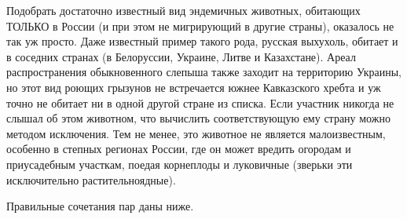 Подобрать достаточно известный вид эндемичных животных, обитающих ТОЛЬКО в России (и при этом не мигрирующий в другие страны), оказалось не так уж просто. Даже известный пример такого рода, русская выхухоль, обитает и в соседних странах (в Белоруссии, Украине, Литве и Казахстане). Ареал распространения обыкновенного слепыша также заходит на территорию Украины, но этот вид роющих грызунов не встречается южнее Кавказского хребта и уж точно не обитает ни в одной другой стране из списка. Если участник никогда не слышал об этом животном, что вычислить соответствующую ему страну можно методом исключения. Тем не менее, это животное не является малоизвестным, особенно в степных регионах России, где он может вредить огородам и приусадебным участкам, поедая корнеплоды и луковичные (зверьки эти исключительно растительноядные).

Правильные сочетания пар даны ниже.


